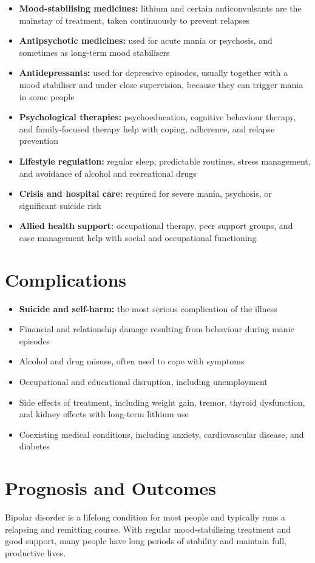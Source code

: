 \begin{itemize}
    \item \textbf{Mood-stabilising medicines:} lithium and certain anticonvulsants are the mainstay of treatment, taken continuously to prevent relapses
    \item \textbf{Antipsychotic medicines:} used for acute mania or psychosis, and sometimes as long-term mood stabilisers
    \item \textbf{Antidepressants:} used for depressive episodes, usually together with a mood stabiliser and under close supervision, because they can trigger mania in some people
    \item \textbf{Psychological therapies:} psychoeducation, cognitive behaviour therapy, and family-focused therapy help with coping, adherence, and relapse prevention
    \item \textbf{Lifestyle regulation:} regular sleep, predictable routines, stress management, and avoidance of alcohol and recreational drugs
    \item \textbf{Crisis and hospital care:} required for severe mania, psychosis, or significant suicide risk
    \item \textbf{Allied health support:} occupational therapy, peer support groups, and case management help with social and occupational functioning
\end{itemize}

\section*{Complications}
\begin{itemize}
    \item \textbf{Suicide and self-harm:} the most serious complication of the illness
    \item Financial and relationship damage resulting from behaviour during manic episodes
    \item Alcohol and drug misuse, often used to cope with symptoms
    \item Occupational and educational disruption, including unemployment
    \item Side effects of treatment, including weight gain, tremor, thyroid dysfunction, and kidney effects with long-term lithium use
    \item Coexisting medical conditions, including anxiety, cardiovascular disease, and diabetes
\end{itemize}

\section*{Prognosis and Outcomes}
Bipolar disorder is a lifelong condition for most people and typically runs a relapsing and remitting course. With regular mood-stabilising treatment and good support, many people have long periods of stability and maintain full, productive lives.

